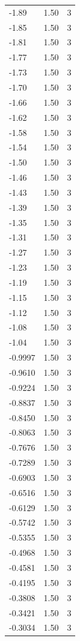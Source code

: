 \begin{longtable}{lrr}
  -1.89 & 1.50 & 3 \\
  -1.85 & 1.50 & 3 \\
  -1.81 & 1.50 & 3 \\
  -1.77 & 1.50 & 3 \\
  -1.73 & 1.50 & 3 \\
  -1.70 & 1.50 & 3 \\
  -1.66 & 1.50 & 3 \\
  -1.62 & 1.50 & 3 \\
  -1.58 & 1.50 & 3 \\
  -1.54 & 1.50 & 3 \\
  -1.50 & 1.50 & 3 \\
  -1.46 & 1.50 & 3 \\
  -1.43 & 1.50 & 3 \\
  -1.39 & 1.50 & 3 \\
  -1.35 & 1.50 & 3 \\
  -1.31 & 1.50 & 3 \\
  -1.27 & 1.50 & 3 \\
  -1.23 & 1.50 & 3 \\
  -1.19 & 1.50 & 3 \\
  -1.15 & 1.50 & 3 \\
  -1.12 & 1.50 & 3 \\
  -1.08 & 1.50 & 3 \\
  -1.04 & 1.50 & 3 \\
  -0.9997 & 1.50 & 3 \\
  -0.9610 & 1.50 & 3 \\
  -0.9224 & 1.50 & 3 \\
  -0.8837 & 1.50 & 3 \\
  -0.8450 & 1.50 & 3 \\
  -0.8063 & 1.50 & 3 \\
  -0.7676 & 1.50 & 3 \\
  -0.7289 & 1.50 & 3 \\
  -0.6903 & 1.50 & 3 \\
  -0.6516 & 1.50 & 3 \\
  -0.6129 & 1.50 & 3 \\
  -0.5742 & 1.50 & 3 \\
  -0.5355 & 1.50 & 3 \\
  -0.4968 & 1.50 & 3 \\
  -0.4581 & 1.50 & 3 \\
  -0.4195 & 1.50 & 3 \\
  -0.3808 & 1.50 & 3 \\
  -0.3421 & 1.50 & 3 \\
  -0.3034 & 1.50 & 3 \\

\end{longtable}
